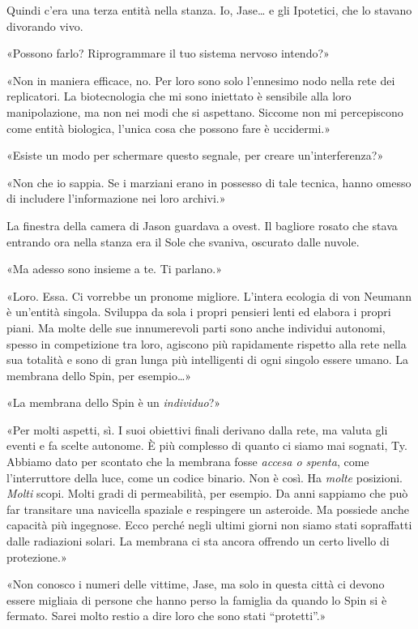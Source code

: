 Quindi c'era una terza entità nella stanza. Io, Jase\ldots{} e gli
Ipotetici, che lo stavano divorando vivo.

«Possono farlo? Riprogrammare il tuo sistema nervoso intendo?»

«Non in maniera efficace, no. Per loro sono solo l'ennesimo nodo nella
rete dei replicatori. La biotecnologia che mi sono iniettato è sensibile
alla loro manipolazione, ma non nei modi che si aspettano. Siccome non
mi percepiscono come entità biologica, l'unica cosa che possono fare è
uccidermi.»

«Esiste un modo per schermare questo segnale, per creare
un'interferenza?»

«Non che io sappia. Se i marziani erano in possesso di tale tecnica,
hanno omesso di includere l'informazione nei loro archivi.»

La finestra della camera di Jason guardava a ovest. Il bagliore rosato
che stava entrando ora nella stanza era il Sole che svaniva, oscurato
dalle nuvole.

«Ma adesso sono insieme a te. Ti parlano.»

«Loro. Essa. Ci vorrebbe un pronome migliore. L'intera ecologia di von
Neumann è un'entità singola. Sviluppa da sola i propri pensieri lenti ed
elabora i propri piani. Ma molte delle sue innumerevoli parti sono anche
individui autonomi, spesso in competizione tra loro, agiscono più
rapidamente rispetto alla rete nella sua totalità e sono di gran lunga
più intelligenti di ogni singolo essere umano. La membrana dello Spin,
per esempio\ldots»

«La membrana dello Spin è un \emph{individuo}?»

«Per molti aspetti, sì. I suoi obiettivi finali derivano dalla rete, ma
valuta gli eventi e fa scelte autonome. È più complesso di quanto ci
siamo mai sognati, Ty. Abbiamo dato per scontato che la membrana fosse
\emph{accesa o spenta}, come l'interruttore della luce, come un codice
binario. Non è così. Ha \emph{molte} posizioni. \emph{Molti} scopi.
Molti gradi di permeabilità, per esempio. Da anni sappiamo che può far
transitare una navicella spaziale e respingere un asteroide. Ma possiede
anche capacità più ingegnose. Ecco perché negli ultimi giorni non siamo
stati sopraffatti dalle radiazioni solari. La membrana ci sta ancora
offrendo un certo livello di protezione.»

«Non conosco i numeri delle vittime, Jase, ma solo in questa città ci
devono essere migliaia di persone che hanno perso la famiglia da quando
lo Spin si è fermato. Sarei molto restio a dire loro che sono stati
``protetti''.»

